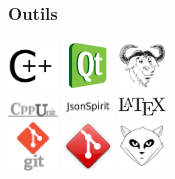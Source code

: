 \begin{frame}
\frametitle{Outils}
\begin{center}
\includegraphics[height=50px]{doc/Presentation/image/cpp.png}
\includegraphics[height=50px]{doc/Presentation/image/qt.jpg}
\includegraphics[height=50px]{doc/Presentation/image/gnu.png}\\
\includegraphics[width=50px]{doc/Presentation/image/cppUnit.pdf}
\includegraphics[width=50px]{doc/Presentation/image/jsonspirit.pdf}
\includegraphics[width=50px]{doc/Presentation/image/latex.png}\\
\includegraphics[height=50px]{doc/Presentation/image/git.pdf}
\includegraphics[height=50px]{doc/Presentation/image/gitg.png}
\includegraphics[height=50px]{doc/Presentation/image/gitlab.pdf}
\end{center}
\end{frame}
